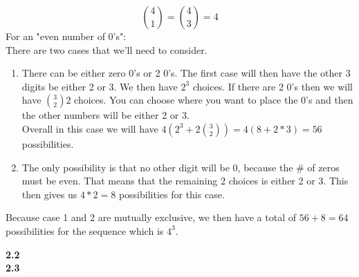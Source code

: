 \documentclass[10pt,a4paper]{report}
\begin{document}
	\[\binom{4}{1} = \binom{4}{3} = 4\]
	For an "even number of 0's":\\
	There are two cases that we'll need to consider.
	\begin{enumerate}
		\item There can be either zero 0's or 2 0's.  The first case will then have the other 3 digits be either 2 or 3.  We then have $2^3$ choices.  If there are 2 0's then we will have $\binom{3}{2}2$ choices.  You can choose where you want to place the 0's and then the other numbers will be either 2 or 3.\\
		Overall in this case we will have $4(2^3 + 2\binom{3}{2}) = 4(8 + 2 * 3) = 56$ possibilities.
		\item The only possibility is that no other digit will be 0, because the \# of zeros must be even.  That means that the remaining 2 choices is either 2 or 3.  This then gives us $4 * 2 = 8$ possibilities for this case.\\
	\end{enumerate}
	
	Because case 1 and 2 are mutually exclusive, we then have a total of $56 + 8 = 64$ possibilities for the sequence which is $4^3$.
	
	
	\textbf{2.2}\\
	\textbf{2.3}\\
\end{document}
